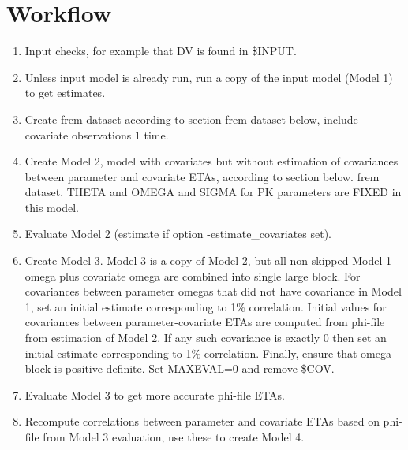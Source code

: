 \section{Workflow}
\begin{enumerate}
\item Input checks, for example that DV is found in \$INPUT.

\item Unless input model is already run,
run a copy of the input model (Model 1) to get estimates.
\item Create frem dataset according to section frem dataset below, include covariate observations 1 time.

\item Create Model 2, model with covariates but without
estimation of covariances between parameter and covariate ETAs,
according to section below. frem dataset.
THETA and OMEGA and SIGMA for PK parameters are FIXED in this model.
\item Evaluate Model 2 (estimate if option -estimate\_covariates set).
\item Create Model 3.
Model 3 is a copy of Model 2, but all non-skipped Model 1 omega plus covariate omega are combined
into single large block. For covariances between parameter omegas that did
not have covariance in Model 1, set %
an initial estimate corresponding to 1\% correlation.
Initial values for covariances between parameter-covariate ETAs are computed from
phi-file from estimation of Model 2. If any such covariance is exactly 0 then set
an initial estimate corresponding to 1\% correlation.
Finally, ensure that omega block is positive definite.
Set MAXEVAL=0 and remove \$COV.
\item Evaluate Model 3 to get more accurate phi-file ETAs.
\item Recompute correlations
between parameter and covariate ETAs based on phi-file from Model 3 evaluation,
use these to create Model 4.


\end{enumerate}
